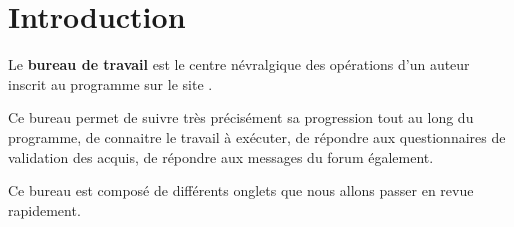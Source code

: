 % 
% 
% 
% 
% 
% 
% 
% 

\section{Introduction}\hypertarget{introduction-bureau}{}\label{introduction-bureau}

Le \textbf{bureau de travail} est le centre névralgique des opérations d'un auteur inscrit au programme \unan{} sur le site \boa{}.

Ce bureau permet de suivre très précisément sa progression tout au long du programme, de connaitre le travail à exécuter, de répondre aux questionnaires de validation des acquis, de répondre aux messages du forum également.

Ce bureau est composé de différents onglets que nous allons passer en revue rapidement.

